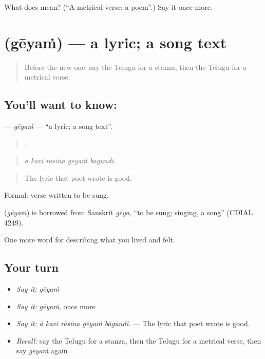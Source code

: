 \begin{tcolorbox}[breakable,colback=teal!4,colframe=teal!35!black,title={Before you move on}]
What does  mean? (\textquotedblleft{}A metrical verse; a poem\textquotedblright{}.) Say it once more.
\end{tcolorbox}
\section[\texorpdfstring{\te{గేయం} (gēyaṁ)}{గేయం (gēyaṁ)}]{ (gēyaṁ) — a lyric; a song text}

\label{lesson:TE-C539-geyam}



\begin{quote}
Before the new one: say the Telugu for a stanza, then the Telugu for a metrical verse.
\end{quote}

\subsection*{You'll want to know: }
\textbf{} — \emph{gēyaṁ} — \textquotedblleft{}a lyric; a song text\textquotedblright{}.

\begin{quote}
    .
\end{quote}

\begin{quote}
\emph{ā kavi rāsina gēyaṁ bāgundi.}
\end{quote}

\begin{quote}
The lyric that poet wrote is good.
\end{quote}

Formal: verse written to be sung.

\begin{cousinweb}
\textbf{} (\emph{gēyaṁ}) is borrowed from Sanskrit \emph{gēya}, \textquotedblleft{}to be sung; singing, a song\textquotedblright{} (CDIAL 4249).
\end{cousinweb}

\begin{grammarlens}[title={What you've built}]
One more word for describing what you lived and felt.
\end{grammarlens}

\subsection*{Your turn}
\begin{itemize}
\raggedright
  \item \emph{Say it:} \emph{gēyaṁ}
  \item \emph{Say it:} \emph{gēyaṁ}, once more
  \item \emph{Say it:} \emph{ā kavi rāsina gēyaṁ bāgundi.} — The lyric that poet wrote is good.
  \item \emph{Recall:} say the Telugu for a stanza, then the Telugu for a metrical verse, then say \emph{gēyaṁ} again
\end{itemize}

